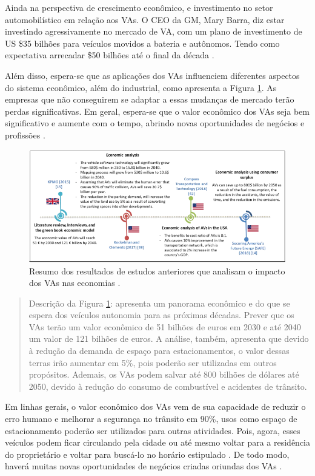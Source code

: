 Ainda na perspectiva de crescimento econômico, e investimento no setor automobilístico em relação aos VAs. O CEO da GM, Mary Barra, diz estar investindo agressivamente no mercado de VA, com um plano de investimento de US \$35 bilhões para veículos movidos a bateria e autônomos. Tendo como expectativa arrecadar \$50 bilhões até o final da década \cite{gm}.

Além disso, espera-se que as aplicações dos VAs influenciem diferentes aspectos do sistema econômico, além do industrial, como apresenta a Figura \ref{figura_resumo}. As empresas que não conseguirem se adaptar a essas mudanças 
 de mercado terão perdas significativas. Em geral, espera-se que o valor econômico dos VAs seja bem significativo e aumente com o tempo, abrindo novas oportunidades de negócios e profissões \cite{mundobrasil}.
\begin{figure}[H]
\centering
\includegraphics[width=\textwidth]{Figures/vas-mercado.png}
\caption{Resumo dos resultados de estudos anteriores que analisam o impacto dos VAs nas economias \cite{mundobrasil}.}
\label{figura_resumo}
\end{figure}
\begin{quote}
Descrição da Figura \ref{figura_resumo}: apresenta um panorama econômico e do que se espera dos veículos autonomia para as próximas décadas. Prever que os VAs terão um valor econômico de 51 bilhões de euros em 2030 e até 2040 um valor de 121 bilhões de euros. A análise, também, apresenta que devido à redução da demanda de espaço para estacionamentos, o valor dessas terras irão aumentar em 5\%, pois poderão ser utilizadas em outros propósitos. Ademais, os VAs podem salvar até 800 bilhões de dólares até 2050, devido à redução do consumo de combustível e acidentes de trânsito. 
\end{quote}

Em linhas gerais, o valor econômico dos VAs vem de sua capacidade de reduzir o erro humano e melhorar a segurança no trânsito em 90\%, usos como espaço de estacionamento poderão ser utilizados para outras atividades. Pois, agora, esses veículos podem ficar circulando pela cidade ou até mesmo voltar para a residência do proprietário e voltar para buscá-lo no horário estipulado \cite{4cenarios_ocidental}. De todo modo, haverá muitas novas oportunidades de negócios criadas oriundas dos VAs \cite{mundobrasil}.

